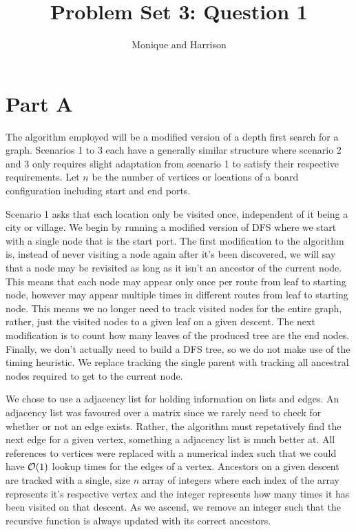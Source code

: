 \documentclass[12pt]{article}
\title{Problem Set 3: Question 1}
\author{Monique and Harrison}
\begin{document}
\maketitle

\section*{Part A}

The algorithm employed will be a modified version of a depth first search for a graph. Scenarios 1 to 3 each have a generally similar structure where scenario 2 and 3 only requires slight adaptation from scenario 1 to satisfy their respective requirements. Let $n$ be the number of vertices or locations of a board configuration including start and end ports.

Scenario 1 asks that each location only be visited once, independent of it being a city or village. We begin by running a modified version of DFS where we start with a single node that is the start port. The first modification to the algorithm is, instead of never visiting a node again after it's been discovered, we will say that a node may be revisited as long as it isn't an ancestor of the current node. This means that each node may appear only once per route from leaf to starting node, however may appear multiple times in different routes from leaf to starting node. This means we no longer need to track visited nodes for the entire graph, rather, just the visited nodes to a given leaf on a given descent. The next modification is to count how many leaves of the produced tree are the end nodes. Finally, we don't actually need to build a DFS tree, so we do not make use of the timing heuristic. We replace tracking the single parent with tracking all ancestral nodes required to get to the current node.

We chose to use a adjacency list for holding information on lists and edges. An adjacency list was favoured over a matrix since we rarely need to check for whether or not an edge exists. Rather, the algorithm must repetatively find the next edge for a given vertex, something a adjacency list is much better at. All references to vertices were replaced with a numerical index such that we could have $\mathcal O(1)$ lookup times for the edges of a vertex. Ancestors on a given descent are tracked with a single, size $n$ array of integers where each index of the array represents it's respective vertex and the integer represents how many times it has been visited on that descent. As we ascend, we remove an integer such that the recursive function is always updated with its correct ancestors.
\end{document}
